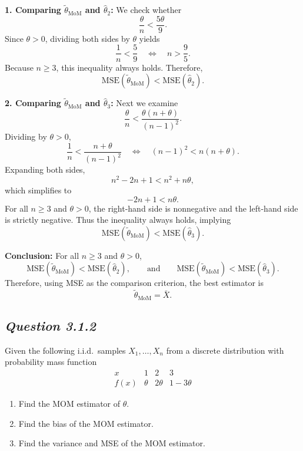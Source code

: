 \documentclass[11pt,letterpaper]{article}
\theoremstyle{remark}
\begin{document}
\textbf{1. Comparing $\tilde{\theta}_{\mathrm{MoM}}$ and $\hat{\theta}_2$:}
We check whether
\[
\frac{\theta}{n} < \frac{5\theta}{9}.
\]
Since $\theta>0$, dividing both sides by $\theta$ yields
\[
\frac{1}{n} < \frac{5}{9}
\quad\Longleftrightarrow\quad
n > \frac{9}{5}.
\]
Because $n \ge 3$, this inequality always holds. Therefore,
\[
\text{MSE}(\tilde{\theta}_{\mathrm{MoM}}) < \text{MSE}(\hat{\theta}_2).
\]

\textbf{2. Comparing $\tilde{\theta}_{\mathrm{MoM}}$ and $\hat{\theta}_3$:}
Next we examine
\[
\frac{\theta}{n} < \frac{\theta(n+\theta)}{(n-1)^2}.
\]
Dividing by $\theta > 0$,
\[
\frac{1}{n} < \frac{n+\theta}{(n-1)^2}
\quad\Longleftrightarrow\quad
(n-1)^2 < n(n+\theta).
\]
Expanding both sides,
\[
n^2 - 2n + 1 < n^2 + n\theta,
\]
which simplifies to
\[
-2n + 1 < n\theta.
\]
For all $n \ge 3$ and $\theta>0$, the right-hand side is nonnegative and the left-hand side is strictly negative. Thus the inequality always holds, implying
\[
\text{MSE}(\tilde{\theta}_{\mathrm{MoM}}) < \text{MSE}(\hat{\theta}_3).
\]

\textbf{Conclusion:}
For all $n \ge 3$ and $\theta>0$,
\[
\text{MSE}(\tilde{\theta}_{\mathrm{MoM}}) < \text{MSE}(\hat{\theta}_2),
\qquad
\text{and}
\qquad
\text{MSE}(\tilde{\theta}_{\mathrm{MoM}}) < \text{MSE}(\hat{\theta}_3).
\]
Therefore, using MSE as the comparison criterion, the best estimator is
\[
\boxed{\tilde{\theta}_{\mathrm{MoM}} = \bar{X}}.
\]

\newpage

\subsection*{\textit{Question 3.1.2}}

Given the following i.i.d.\ samples $X_1, \dots, X_n$ from a discrete distribution with probability mass function
\[
\begin{array}{c|ccc}
x      & 1 & 2 & 3 \\ \hline
f(x)   & \theta & 2\theta & 1 - 3\theta
\end{array}
\]

\begin{enumerate}
    \item[(a)] Find the MOM estimator of $\theta$.
    \item[(b)] Find the bias of the MOM estimator.
    \item[(c)] Find the variance and MSE of the MOM estimator.
\end{enumerate}
\end{document}
